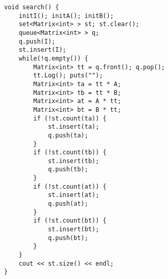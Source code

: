\documentclass[11pt]{article}
\begin{document}
\begin{verbatim}
void search() {
    initI(); initA(); initB();
    set<Matrix<int> > st; st.clear();
    queue<Matrix<int> > q;
    q.push(I);
    st.insert(I);
    while(!q.empty()) {
        Matrix<int> tt = q.front(); q.pop();
        tt.Log(); puts("");
        Matrix<int> ta = tt * A;
        Matrix<int> tb = tt * B;
        Matrix<int> at = A * tt;
        Matrix<int> bt = B * tt;
        if (!st.count(ta)) {
            st.insert(ta);
            q.push(ta);
        }
        if (!st.count(tb)) {
            st.insert(tb);
            q.push(tb);
        }
        if (!st.count(at)) {
            st.insert(at);
            q.push(at);
        }
        if (!st.count(bt)) {
            st.insert(bt);
            q.push(bt);
        }
    }
    cout << st.size() << endl;
}
\end{verbatim}
\end{document}
